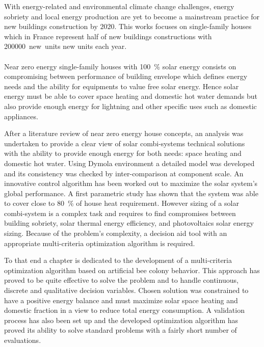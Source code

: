 


With energy-related and environmental climate change challenges, energy sobriety and local
energy production are yet to become a mainstream practice for new buildings construction by
$2020$. This works focuses on single-family houses which in France represent half of new
buildings constructions with \SI{200000}{new units} new units each year.

\paragraph{} %
Near zero energy single-family houses with \SI{100}{\percent} solar energy consists on compromising
between performance of building envelope which defines energy needs and the ability
for equipments to value free solar energy. Hence solar energy must be able to cover
space heating and domestic hot water demands but also provide enough energy for
lightning and other specific uses such as domestic appliances.

After a literature review of near zero energy house concepts, an analysis was undertaken
to provide a clear view of solar combi-systems technical solutions with the ability to
provide enough energy for both needs: space heating and domestic hot water. Using Dymola
environment a detailed model was developed and its consistency was checked by
inter-comparison at component scale. An innovative control algorithm has been worked out to
maximize the solar system’s global performance. A first parametric study has shown that the system
was able to cover close to \SI{80}{\percent} of house heat requirement. However sizing of a solar
combi-system is a complex task and requires to find compromises between building sobriety, solar
thermal energy efficiency, and photovoltaics solar energy sizing. Because of the problem’s
complexity, a decision aid tool with an appropriate multi-criteria optimization algorithm
is required.

To that end a chapter is dedicated to the development of a multi-criteria optimization
algorithm based on artificial bee colony behavior. This approach has proved to be quite effective
to solve the problem and to handle continuous, discrete and qualitative decision variables.
Chosen solution was constrained to have a positive energy balance and must maximize solar
space heating and domestic fraction in a view to reduce total energy consumption.
A validation process has also been set up and the developed optimization algorithm
has proved its ability to solve standard problems with a fairly short number of evaluations.

